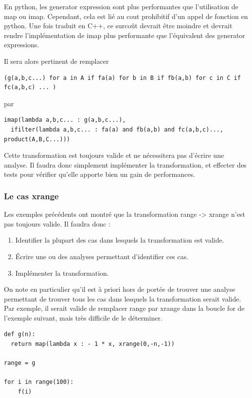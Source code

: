 \documentclass[a4paper]{article}
\begin{document}
En python, les generator expression sont plus performantes que l'utilisation de map ou imap. Cependant, cela est lié au cout prohibitif d'un appel de fonction en python. Une fois traduit en C++, ce surcoût devrait être moindre et devrait rendre l'implémentation de imap plus performante que l'équivalent des generator expressions.

Il sera alors pertinent de remplacer

\begin{verbatim}
(g(a,b,c...) for a in A if fa(a) for b in B if fb(a,b) for c in C if fc(a,b,c) ... )
\end{verbatim}
 
par

\begin{verbatim}
imap(lambda a,b,c... : g(a,b,c...), 
  ifilter(lambda a,b,c... : fa(a) and fb(a,b) and fc(a,b,c)..., product(A,B,C...)))
\end{verbatim}

Cette transformation est toujours valide et ne nécessitera pas d'écrire une analyse. Il faudra donc simplement implémenter la transformation, et effecter des tests pour vérifier qu'elle apporte bien un gain de performances.

\subsubsection{Le cas xrange}

Les exemples précédents ont montré que la transformation range -> xrange n'est pas toujours valide. Il faudra donc :

\begin{enumerate}
  \item Identifier la plupart des cas dans lesquels la transformation est valide.
  \item Écrire une ou des analyses permettant d'identifier ces cas.
  \item Implémenter la transformation.
\end{enumerate}

On note en particulier qu'il est à priori hors de portée de trouver une analyse permettant de trouver tous les cas dans lesquels la transformation serait valide. Par exemple, il serait valide de remplacer range par xrange dans la boucle for de l'exemple suivant, mais très difficile de le déterminer.


\begin{verbatim}
def g(n):
  return map(lambda x : - 1 * x, xrange(0,-n,-1))

range = g

for i in range(100):
    f(i)
\end{verbatim}
\end{document}
